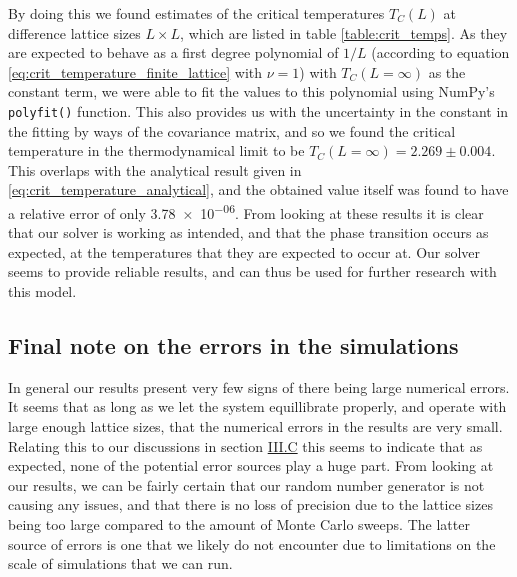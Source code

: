 \documentclass[reprint,english,notitlepage]{revtex4-1}  %
\begin{document}
By doing this we found estimates of the critical temperatures $T_C(L)$ at difference lattice sizes $L \times L$, which are listed in table \ref{table:crit_temps}. As they are expected to behave as a first degree polynomial of $1/L$ (according to equation \eqref{eq:crit_temperature_finite_lattice} with $\nu=1$) with $T_C(L=\infty)$ as the constant term, we were able to fit the values to this polynomial using NumPy's \verb+polyfit()+ function. This also provides us with the uncertainty in the constant in the fitting by ways of the covariance matrix, and so we found the critical temperature in the thermodynamical limit to be $T_C(L=\infty) = 2.269 \pm 0.004$. This overlaps with the analytical result given in \eqref{eq:crit_temperature_analytical}, and the obtained value itself was found to have a relative error of only \num{3.78e-06}. From looking at these results it is clear that our solver is working as intended, and that the phase transition occurs as expected, at the temperatures that they are expected to occur at. Our solver seems to provide reliable results, and can thus be used for further research with this model. 


\subsection{Final note on the errors in the simulations} \label{sec:V:E}

In general our results present very few signs of there being large numerical errors. It seems that as long as we let the system equillibrate properly, and operate with large enough lattice sizes, that the numerical errors in the results are very small. Relating this to our discussions in section \hyperref[sec:III:C]{III.C} this seems to indicate that as expected, none of the potential error sources play a huge part. From looking at our results, we can be fairly certain that our random number generator is not causing any issues, and that there is no loss of precision due to the lattice sizes being too large compared to the amount of Monte Carlo sweeps. The latter source of errors is one that we likely do not encounter due to limitations on the scale of simulations that we can run. 
\end{document}
